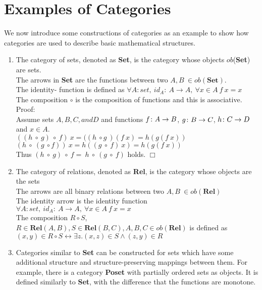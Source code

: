 \section {Examples of Categories}
We now introduce some constructions of categories as an example to show
how categories are used to describe basic mathematical structures.
\begin {enumerate}
 \item The category of sets, denoted as \textbf{Set}, is the category whose objects $ob$(\textbf{Set}) are sets.
   \\ The arrows in \textbf{Set} are the functions between two $A,B\ \in ob(\textbf{Set}).$
   \\ The identity- function is defined as $\forall A: set, \ id_A:\ A \to A,\ \forall x \in A \ f \ x = x$
   \\ The composition $\circ$ is the composition of functions and this is associative. Proof:
   \\ Assume sets $A, B, C, and D$ and functions $f \from A \to B$, $g \from B \to C$, $h \from C \to D$ and $x \in A$.
   \\ $((h\ \circ \ g)\ \circ\ f)\ x = ((h \ \circ g \ )(f \ x) =h(g(f\  x)) $
   \\ $(h\ \circ \ (g \ \circ f))\ x = h ((g\ \circ \ f) \ x) = h(g(f \ x))$
   \\ Thus $(h\ \circ \ g)\ \circ \ f = \ h \ \circ \ (g \ \circ \ f)$ holds. $\Box$
 \item The category of relations, denoted as \textbf{Rel}, is the category whose objects are the sets
   \\The arrows are all binary relations between two $A,B \ \in ob(\textbf{Rel})$
   \\The identity arrow  is the identity function $\forall A: set, \ id_A:\ A \to A,\ \forall x \in A \ f \ x = x$
   \\ The composition $R \circ S$, $R  \in \textbf{Rel}(A,B), S \in \textbf{Rel}(B,C), A,B,C \in ob(\textbf{Rel})$
   is defined as $ (x,y) \in  R \circ S \leftrightarrow \exists  z.(x,z) \in S \land (z,y) \in R$
   
 \item Categories similar to \textbf{Set} can be constructed for sets which have some additional structure and structure-preserving mappings between them.
   For example, there is a category \textbf{Poset} with partially ordered sets as objects. It is defined similarly to \textbf{Set}, with the difference that the functions are monotone. 
  

\end{enumerate}
